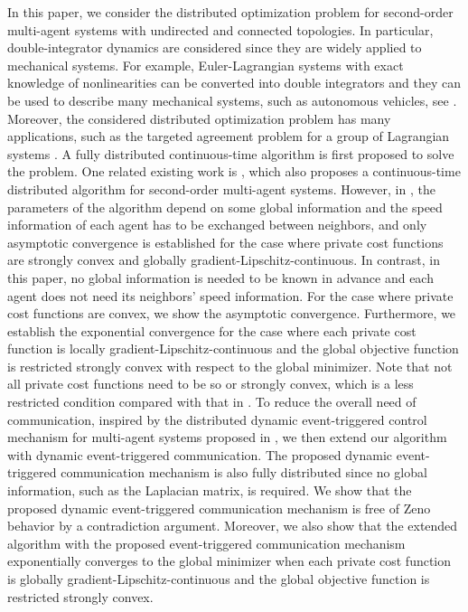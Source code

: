 \documentclass[letterpaper, 10 pt, conference]{ieeeconf}  %
\begin{document}
In this paper, we consider the distributed optimization problem for second-order multi-agent systems with undirected and connected topologies.
In particular, double-integrator dynamics are considered since they are widely applied to mechanical systems. For example, Euler-Lagrangian systems with exact knowledge of nonlinearities can be converted into double integrators and they can be used to describe many mechanical systems, such as autonomous vehicles, see \cite{qiu2016optimal,zhang2017distributed}. Moreover, the considered distributed optimization problem has many applications, such as the targeted agreement problem for a group of Lagrangian systems \cite{meng2017targeted}.
A fully distributed continuous-time algorithm is first proposed to solve the problem.
One related existing work is \cite{zhang2014distributed}, which also proposes a continuous-time distributed algorithm for second-order multi-agent systems.
However, in \cite{zhang2014distributed}, the parameters of the algorithm depend on some global information and the speed information of each agent has to be exchanged between neighbors, and only asymptotic convergence is established for the case where private cost functions are strongly convex and globally  gradient-Lipschitz-continuous.
In contrast, in this paper, no global information is needed to be known in advance and each agent does not need its neighbors' speed information.
For the case where private cost functions are convex, we show the asymptotic convergence.
Furthermore, we establish the exponential convergence for the case where each private cost function is locally  gradient-Lipschitz-continuous and the global objective function is restricted strongly convex  with respect to the global minimizer.
Note that not all private cost functions need to be so or strongly convex, which is a less restricted condition compared with that in \cite{zhang2014distributed}.
To reduce the overall need of communication, inspired by the distributed dynamic event-triggered control mechanism for multi-agent systems proposed in \cite{yi2017distributed}, we then extend our algorithm with dynamic event-triggered communication.
The proposed dynamic event-triggered communication mechanism is also fully distributed since no global information, such as the Laplacian matrix, is required.
We show that the proposed dynamic event-triggered communication mechanism is free of Zeno behavior by a contradiction argument.
Moreover, we also show that the extended algorithm with the proposed event-triggered communication  mechanism exponentially converges to the global minimizer when each private cost function is globally  gradient-Lipschitz-continuous and the global objective function is restricted strongly convex.
\end{document}
